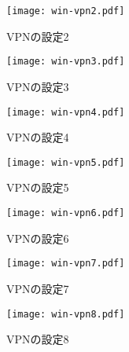 \begin{figure}[htbp]
 \begin{center}
  \texttt{[image: win-vpn2.pdf]}
 \end{center}
 \caption{VPNの設定2}
 \label{winvpn2}
\end{figure}

\begin{figure}[htbp]
 \begin{center}
  \texttt{[image: win-vpn3.pdf]}
 \end{center}
 \caption{VPNの設定3}
 \label{winvpn3}
\end{figure}

\begin{figure}[htbp]
 \begin{center}
  \texttt{[image: win-vpn4.pdf]}
 \end{center}
 \caption{VPNの設定4}
 \label{winvpn4}
\end{figure}

\begin{figure}[htbp]
 \begin{center}
  \texttt{[image: win-vpn5.pdf]}
 \end{center}
 \caption{VPNの設定5}
 \label{winvpn5}
\end{figure}

\begin{figure}[htbp]
 \begin{center}
  \texttt{[image: win-vpn6.pdf]}
 \end{center}
 \caption{VPNの設定6}
 \label{winvpn6}
\end{figure}

\begin{figure}[htbp]
 \begin{center}
  \texttt{[image: win-vpn7.pdf]}
 \end{center}
 \caption{VPNの設定7}
 \label{winvpn7}
\end{figure}

\begin{figure}[htbp]
 \begin{center}
  \texttt{[image: win-vpn8.pdf]}
 \end{center}
 \caption{VPNの設定8}
 \label{winvpn8}
\end{figure}
